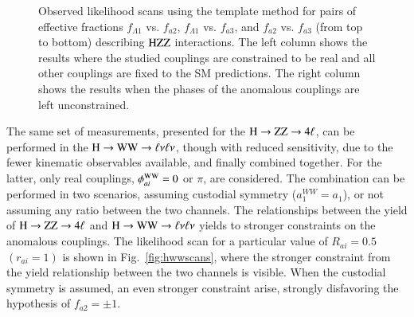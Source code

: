 \begin{enumerate}
\begin{figure}[!htbp]
\begin{center}
        \caption{
        Observed likelihood scans using the template method for pairs of effective fractions $f_{\Lambda1}$ vs. $f_{a2}$, 
        $f_{\Lambda1}$ vs. $f_{a3}$, and $f_{a2}$ vs. $f_{a3}$ (from top to bottom) describing $\mathrm{H}\mathrm{Z}\mathrm{Z}$ interactions. 
        The left column shows the results where the studied couplings are constrained to be real
        and all other couplings are fixed to the SM predictions.
        The right column shows the results when the phases of the anomalous couplings are left unconstrained. 
        \label{fig:results_ZZ_2D}
        }
\end{center}
\end{figure}

\end{enumerate}

The same set of measurements, presented for the $\mathrm{H}\to\mathrm{Z}\mathrm{Z}\to4\ell$, can be
performed in the $\mathrm{H}\to\mathrm{W}\mathrm{W}\to\ell\nu\ell\nu$, though with reduced sensitivity, due to
the fewer kinematic observables available, and finally combined
together. For the latter, only real couplings, $\phi_{ai}^{\mathrm{W}\mathrm{W}}=0$
or $\pi$, are considered. The combination can be performed in two
scenarios, assuming custodial symmetry ($a_1^{WW} = a_1$), or not
assuming any ratio between the two channels. The relationships between
the yield of $\mathrm{H}\to\mathrm{Z}\mathrm{Z}\to4\ell$ and $\mathrm{H}\to\mathrm{W}\mathrm{W}\to\ell\nu\ell\nu$ yields to stronger constraints
on the anomalous couplings.  The likelihood scan for a particular
value of $R_{ai}=0.5$ $(r_{ai} = 1)$ is shown in
Fig.~\ref{fig:hwwscans}, where the stronger constraint from the yield
relationship between the two channels is visible. When the custodial
symmetry is assumed, an even stronger constraint arise, strongly
disfavoring the hypothesis of $f_{a2}=\pm1$.
%

